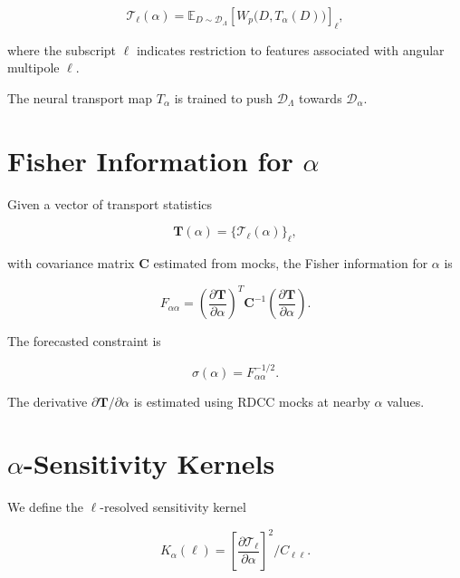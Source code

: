 \documentclass[11pt,a4paper]{article}
\begin{document}
\begin{equation}
    \mathcal{T}_{\ell}(\alpha)
    =
    \mathbb{E}_{D \sim \mathcal{D}_{\Lambda}}
    \left[
        W_{p}\bigl(D, T_{\alpha}(D)\bigr)
    \right]_{\ell},
\end{equation}

where the subscript $\ell$ indicates restriction to features associated with 
angular multipole $\ell$.

The neural transport map $T_{\alpha}$ is trained to push $\mathcal{D}_{\Lambda}$ 
towards $\mathcal{D}_{\alpha}$.
\section{Fisher Information for \texorpdfstring{$\alpha$}{alpha}}

Given a vector of transport statistics


\[
    \mathbf{T}(\alpha)
    = \{ \mathcal{T}_{\ell}(\alpha) \}_{\ell},
\]


with covariance matrix $\mathbf{C}$ estimated from mocks, the Fisher information 
for $\alpha$ is

\begin{equation}
    F_{\alpha\alpha}
    =
    \left( 
        \frac{\partial \mathbf{T}}{\partial \alpha}
    \right)^{\!\!T}
    \mathbf{C}^{-1}
    \left(
        \frac{\partial \mathbf{T}}{\partial \alpha}
    \right).
\end{equation}

The forecasted constraint is



\[
    \sigma(\alpha) = F_{\alpha\alpha}^{-1/2}.
\]



The derivative $\partial \mathbf{T} / \partial \alpha$ is estimated using RDCC 
mocks at nearby $\alpha$ values.
\section{\texorpdfstring{$\alpha$}{alpha}-Sensitivity Kernels}

We define the $\ell$-resolved sensitivity kernel

\begin{equation}
    K_{\alpha}(\ell)
    =
    \left[
        \frac{\partial \mathcal{T}_{\ell}}{\partial \alpha}
    \right]^{2}
    \bigg/
    C_{\ell\ell}.
\end{equation}
\end{document}
